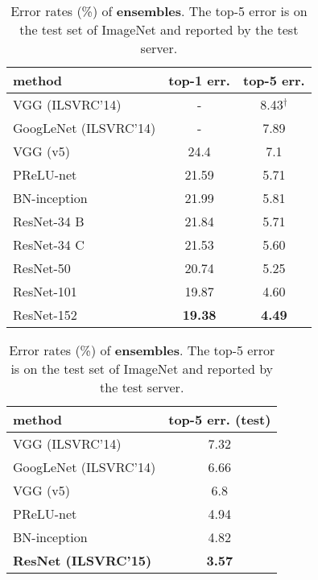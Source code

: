 \documentclass{article}
\begin{document}
\begin{table}[t]
\setlength{\tabcolsep}{8pt}
\small
\begin{center}
\begin{tabular}{l|c c}
\hline
\footnotesize method & \footnotesize top-1 err. & \footnotesize top-5 err.\\
\hline
VGG \cite{Simonyan2015} (ILSVRC'14) & - & 8.43$^{\dag}$\\
GoogLeNet \cite{Szegedy2015} (ILSVRC'14) & - & 7.89\\
\hline
VGG \cite{Simonyan2015} \footnotesize (v5) & 24.4 & 7.1\\
PReLU-net \cite{He2015} & 21.59 & 5.71 \\
BN-inception \cite{Ioffe2015} & 21.99 & 5.81 \\\hline
ResNet-34 B & 21.84 & 5.71 \\
ResNet-34 C & 21.53 & 5.60 \\
ResNet-50 & 20.74 & 5.25 \\
ResNet-101 & 19.87 & 4.60 \\
ResNet-152 & \textbf{19.38} & \textbf{4.49} \\
\hline
\end{tabular}
\end{center}
\vspace{-.5em}
\caption{Error rates (\%) of \textbf{single-model} results on the ImageNet validation set (except $^{\dag}$ reported on the test set).}
\label{tab:single}
\setlength{\tabcolsep}{12pt}
\small
\begin{center}
\begin{tabular}{l|c}
\hline
\footnotesize method & top-5 err. (\textbf{test}) \\
\hline
VGG \cite{Simonyan2015} (ILSVRC'14) & 7.32\\
GoogLeNet \cite{Szegedy2015} (ILSVRC'14) & 6.66\\
\hline
VGG \cite{Simonyan2015} \footnotesize (v5) & 6.8 \\
PReLU-net \cite{He2015} & 4.94 \\
BN-inception \cite{Ioffe2015} & 4.82 \\\hline
\textbf{ResNet (ILSVRC'15)} & \textbf{3.57} \\
\hline
\end{tabular}
\end{center}
\vspace{-.5em}
\caption{Error rates (\%) of \textbf{ensembles}. The top-5 error is on the test set of ImageNet and reported by the test server.}
\label{tab:ensemble}
\end{table}
\end{document}
